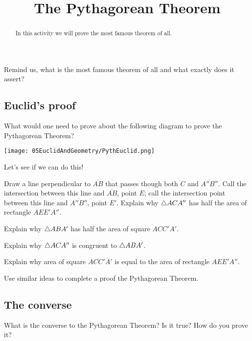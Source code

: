 \documentclass{ximera}
\title{The Pythagorean Theorem}
\begin{document}
\begin{abstract}
In this activity we will prove the most famous theorem of
  all.
\end{abstract}
\maketitle



\begin{question}
Remind us, what is the most famous theorem of all and what exactly
does it assert?
\end{question}


\subsection{Euclid's proof}


\begin{question} 
What would one need to prove about the following diagram to prove the
Pythagorean Theorem?
\begin{image}
\texttt{[image: 05EuclidAndGeometry/PythEuclid.png]}
\end{image}
\end{question}

Let's see if we can do this!


\begin{question}
Draw a line perpendicular to $\overline{AB}$ that passes though both $C$
and $\overline{A'' B''}$. Call the intersection between this line and
$\overline{AB}$, point $E$; call the intersection point between this line
and $\overline{A''B''}$, point $E'$. Explain why $\triangle ACA''$ has half the
area of rectangle $AEE'A''$.
\end{question}

\begin{question}
Explain why $\triangle ABA'$ has half the area of square $ACC'A'$.
\end{question}

\begin{question}
Explain why $\triangle ACA''$ is congruent to $\triangle ABA'$. 
\end{question}

\begin{question}
Explain why area of square $ACC'A'$ is equal to the area of rectangle
$AEE'A''$.
\end{question}


\begin{question}
Use similar ideas to complete a proof the Pythagorean Theorem.
\end{question}


\subsection{The converse}

\begin{question} What is the converse to the Pythagorean Theorem? Is it true? How do you prove it?
\end{question}
\end{document}
